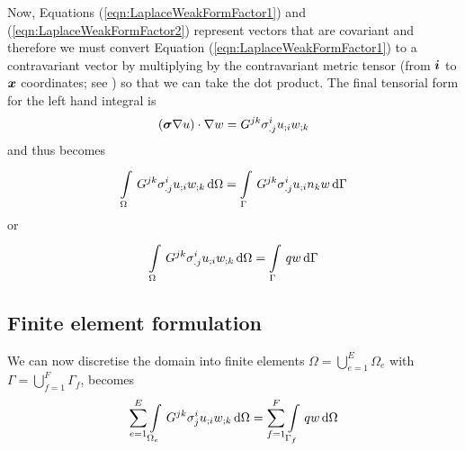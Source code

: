 Now, Equations (\ref{eqn:LaplaceWeakFormFactor1}) and (\ref{eqn:LaplaceWeakFormFactor2})
represent vectors that are covariant and therefore we must convert Equation
(\ref{eqn:LaplaceWeakFormFactor1}) to a contravariant vector by 
multiplying by the contravariant metric tensor (from $ \boldsymbol{i} $ to $ \boldsymbol{x} $ 
coordinates; see )
so that we can take the dot product. The final tensorial form for the left
hand integral is
\begin{equation}
  \dotprod{\pbrac{\tensor{\sigma}\gradient{}{u}}}{\gradient{}{w}} = 
  G^{jk}\sigma^{i}_{.j}\covarderiv{u}{i}\covarderiv{w}{k}
\end{equation}
and thus  becomes
\begin{equation}
  \gint{\Omega}{}{G^{jk}\sigma^{i}_{.j}\covarderiv{u}{i}\covarderiv{w}{k}}{\Omega}
  = \gint{\Gamma}{}{G^{jk}\sigma^{i}_{.j}\covarderiv{u}{i}n_{k}w}{\Gamma}
  \label{eqn:LaplaceWeightedResidualTensorForm1}
\end{equation}
or
\begin{equation}
  \gint{\Omega}{}{G^{jk}\sigma^{i}_{.j}\covarderiv{u}{i}\covarderiv{w}{k}}{\Omega}
  = \gint{\Gamma}{}{qw}{\Gamma}
  \label{eqn:LaplaceWeightedResidualTensorForm2}
\end{equation}

\subsection{Finite element formulation}

We can now discretise the domain into finite elements \ie $\Omega=
\displaystyle{\bigcup_{e=1}^{E}}\Omega_{e}$ with
$\Gamma=\displaystyle{\bigcup_{f=1}^{F}}\Gamma_{f}$, 
 becomes
\begin{equation}
  \dsum_{e=1}^{E}\gint{\Omega_{e}}{}{G^{jk}\sigma^{i}_{j}\covarderiv{u}{i}\covarderiv{w}{k}}{\Omega}
  =\dsum_{f=1}^{F}\gint{\Gamma_{f}}{}{qw}{\Omega}
\end{equation}

